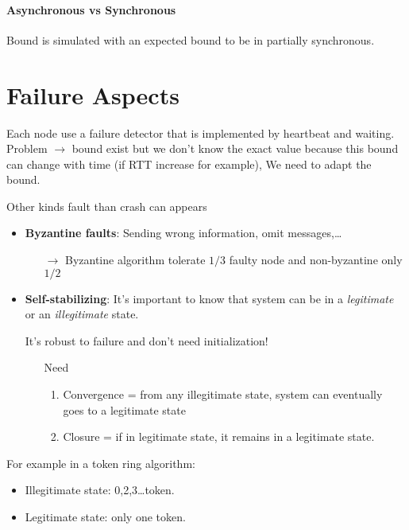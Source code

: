 \paragraph{Asynchronous vs Synchronous}

Bound is simulated with an expected bound to be in partially synchronous.

\section{Failure Aspects}
Each node use a failure detector that is implemented by
heartbeat and waiting.\\
Problem $\to$ bound exist but we don't know the exact value because
this bound can change with time (if RTT increase for example),
We need to adapt the bound.

Other kinds fault than crash can appears
\begin{itemize}
    \item \textbf{Byzantine faults}: Sending wrong information, omit
        messages,\ldots
        \begin{enumerate}
            \item[$\to$] Byzantine algorithm tolerate $1/3$ faulty node and
                non-byzantine only $1/2$
        \end{enumerate}
    \item \textbf{Self-stabilizing}: It's important to know that system
        can be in a \textit{legitimate} or an
        \textit{illegitimate} state.

        It's robust to failure and don't need initialization!

        \begin{enumerate}
            \item[Need]
                \begin{enumerate}
                    \item Convergence = from any illegitimate state,
                        system can eventually goes to a legitimate state
                    \item Closure = if in legitimate state, it remains
                        in a legitimate state.
                \end{enumerate}
        \end{enumerate}
\end{itemize}
For example in a token ring algorithm:
\begin{itemize}
	\item Illegitimate state: 0,2,3\ldots token.
	\item Legitimate state: only one token.
\end{itemize}
